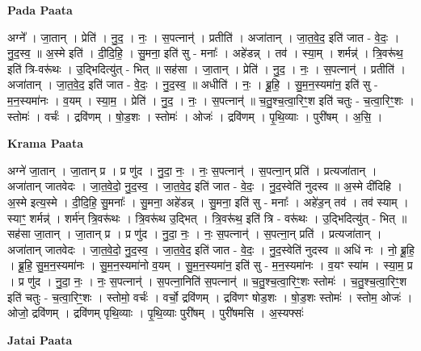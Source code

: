 \documentclass[17pt]{extarticle}
\begin{document}
\textbf{Pada Paata} \newline

अग्ने᳚ । जा॒तान् । प्रेति॑ । नु॒द॒ । नः॒ । स॒पत्नान्॑ । प्रतीति॑ । अजा॑तान् । जा॒त॒वे॒द॒ इति॑ जात - वे॒दः॒ । नु॒द॒स्व॒ ॥ अ॒स्मे इति॑ । दी॒दि॒हि॒ । सु॒मना॒ इति॑ सु - मनाः᳚ । अहे॑डन्न् । तव॑ । स्या॒म् । शर्मन्न्॑ । त्रि॒वरू॑थ॒ इति॑ त्रि-वरू॑थः । उ॒द्भिदित्यु॑त् - भित् ॥ सह॑सा । जा॒तान् । प्रेति॑ । नु॒द॒ । नः॒ । स॒पत्नान्॑ । प्रतीति॑ । अजा॑तान् । जा॒त॒वे॒द॒ इति॑ जात - वे॒दः॒ । नु॒द॒स्व॒ ॥ अधीति॑ । नः॒ । ब्रू॒हि॒ । सु॒म॒न॒स्यमा॑न॒ इति॑ सु - म॒न॒स्यमा॑नः । व॒यम् । स्या॒म॒ । प्रेति॑ । नु॒द॒ । नः॒ । स॒पत्नान्॑ ॥ च॒तु॒श्च॒त्वा॒रिꣳ॒॒श इति॑ चतुः - च॒त्वा॒रिꣳ॒॒शः । स्तोमः॑ । वर्चः॑ । द्रवि॑णम् । षो॒ड॒शः । स्तोमः॑ । ओजः॑ । द्रवि॑णम् । पृ॒थि॒व्याः । पुरी॑षम् । अ॒सि॒ ।  \newline


\textbf{Krama Paata} \newline

अग्ने॑ जा॒तान् । जा॒तान् प्र । प्र णु॑द । नु॒दा॒ नः॒ । नः॒ स॒पत्नान्॑ । स॒पत्ना॒न् प्रति॑ । प्रत्यजा॑तान् । अजा॑तान् जातवेदः । जा॒त॒वे॒दो॒ नु॒द॒स्व॒ । जा॒त॒वे॒द॒ इति॑ जात - वे॒दः॒ । नु॒द॒स्वेति॑ नुदस्व ॥ अ॒स्मे दी॑दिहि । अ॒स्मे इत्य॒स्मे । दी॒दि॒हि॒ सु॒मनाः᳚ । सु॒मना॒ अहे॑डन्न् । सु॒मना॒ इति॑ सु - मनाः᳚ । अहे॑ड॒न् तव॑ । तव॑ स्याम् । स्याꣳ॒॒ शर्मन्न्॑ । 
शर्म॑न् त्रि॒वरू॑थः । त्रि॒वरू॑थ उ॒द्भित् । त्रि॒वरू॑थ॒ इति॑ त्रि - वरू॑थः । उ॒द्भिदित्यु॑त् - भित् ॥ सह॑सा जा॒तान् । जा॒तान् प्र । 
प्र णु॑द । नु॒दा॒ नः॒ । नः॒ स॒पत्नान्॑ । स॒पत्ना॒न् प्रति॑ । प्रत्यजा॑तान् । अजा॑तान् जातवेदः । जा॒त॒वे॒दो॒ नु॒द॒स्व॒ । जा॒त॒वे॒द॒ इति॑ जात - वे॒दः॒ । नु॒द॒स्वेति॑ नुदस्व ॥ अधि॑ नः । नो॒ ब्रू॒हि॒ । ब्रू॒हि॒ सु॒म॒न॒स्यमा॑नः । सु॒म॒न॒स्यमा॑नो व॒यम् । सु॒म॒न॒स्यमा॑न॒ इति॑ सु - म॒न॒स्यमा॑नः । व॒यꣳ स्या॑म । स्या॒म॒ प्र । प्र णु॑द । नु॒दा॒ नः॒ । नः॒ स॒पत्नान्॑ । स॒पत्ना॒निति॑ स॒पत्नान्॑ ॥ च॒तु॒श्च॒त्वा॒रिꣳ॒॒शः स्तोमः॑ । च॒तु॒श्च॒त्वा॒रिꣳ॒॒श इति॑ चतुः - च॒त्वा॒रिꣳ॒॒शः । स्तोमो॒ वर्चः॑ । वर्चो॒ द्रवि॑णम् । द्रवि॑णꣳ षोड॒शः । षो॒ड॒शः स्तोमः॑ । स्तोम॒ ओजः॑ । ओजो॒ द्रवि॑णम् । द्रवि॑णम् पृथि॒व्याः । पृ॒थि॒व्याः पुरी॑षम् । पुरी॑षमसि । अ॒स्यफ्सः॑ \newline

\textbf{Jatai Paata} \newline
\end{document}
